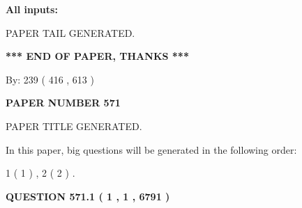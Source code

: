 \documentclass[12pt]{article}
\begin{document}
   
   
   
\noindent{}
   
   
   
   
\noindent\vspace{0.1in}\hspace{-0.08in} {\textbf{\Large{All inputs: }}}
   
   
   
   
   
   
 \vspace{0.2in}
 
   
   
\vspace{2.0in} PAPER TAIL GENERATED.
   
   
   
   
\vspace{1.0in} 
{\textbf{\large{ *** END OF PAPER, THANKS *** }}} 
   
   
\hspace{1.0in} By: 
 239 ( 416 ,  613 )
   
   
   
   
\newpage 
\setcounter{page}{ 
   571001 } 
   
   
   
   
 {\textbf{ \Large{ PAPER NUMBER  571  }}}
   
   
\vspace{0.2in}
   
   
   
   
   
   
   
   
 \vspace{0.2in}
 
 
 
 
   
   
 PAPER TITLE GENERATED.
   
   
   
\vspace{0.2in}
   
In this paper, big questions will be generated in the following order: 
   
   
   1 ( 1 )
 ,
   2 ( 2 )
 .
  
\vspace{0.2in}
  
{\textbf{\Large{QUESTION
571.1 
 ( 1 , 1 , 6791 )
}}}
  
\end{document}
